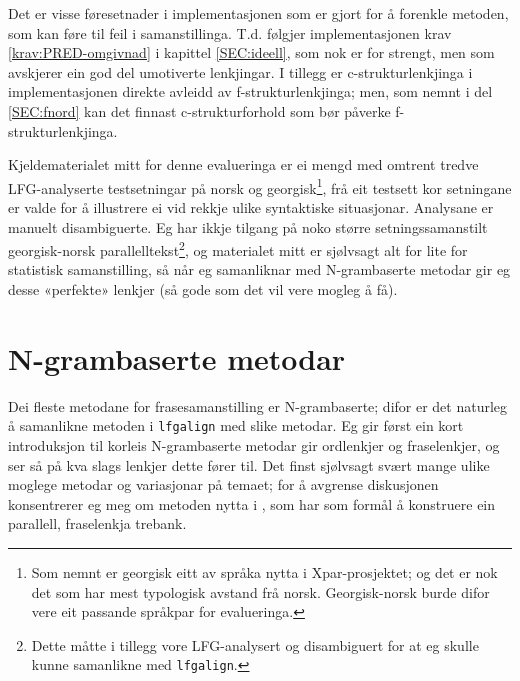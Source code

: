 \documentclass[11pt,a4paper,oneside,draft]{book}
\begin{document}
 Det er visse føresetnader i implementasjonen som er gjort for å
 forenkle metoden, som kan føre til feil i
 samanstillinga. T.d. følgjer implementasjonen krav
 \ref{krav:PRED-omgivnad} i kapittel \ref{SEC:ideell}, som nok er for
 strengt, men som avskjerer ein god del umotiverte lenkjingar. I
 tillegg er c-strukturlenkjinga i implementasjonen direkte avleidd av
 f-strukturlenkjinga; men, som nemnt i del \ref{SEC:fnord} kan det
 finnast c-strukturforhold som bør påverke
 f-strukturlenkjinga. 

 Kjeldematerialet mitt for denne evalueringa er ei mengd med omtrent
 tredve 
 LFG-analyserte testsetningar på norsk og georgisk\footnote{Som nemnt er georgisk eitt av språka nytta i Xpar-prosjektet;
        og det er nok det som har mest typologisk avstand frå
        norsk. Georgisk-norsk burde difor vere eit passande språkpar
        for evalueringa. }, frå eit
 testsett kor setningane er valde for å illustrere ei vid rekkje ulike
 syntaktiske situasjonar. Analysane er manuelt disambiguerte.  Eg har
 ikkje tilgang på noko større setningssamanstilt georgisk-norsk
 parallelltekst\footnote{Dette måtte i tillegg vore LFG-analysert og disambiguert for
        at eg skulle kunne samanlikne med \texttt{lfgalign}. }, og materialet mitt er sjølvsagt alt for lite
 for statistisk samanstilling, så når eg samanliknar med N-grambaserte
 metodar gir eg desse «perfekte» lenkjer (så gode som det vil vere
 mogleg å få).


\section{N-grambaserte metodar}
\label{sec-5.1}


 Dei fleste metodane for frasesamanstilling er N-grambaserte; difor er
 det naturleg å samanlikne metoden i \texttt{lfgalign} med slike metodar. Eg
 gir først ein kort introduksjon til korleis N-grambaserte metodar gir
 ordlenkjer og fraselenkjer, og ser så på kva slags lenkjer dette
 fører til. Det finst sjølvsagt svært mange ulike moglege metodar og
 variasjonar på temaet; for å avgrense diskusjonen konsentrerer eg meg
 om metoden nytta i \citet{samuelsson2007apa}, som har som formål å
 konstruere ein parallell, fraselenkja trebank.
\end{document}
